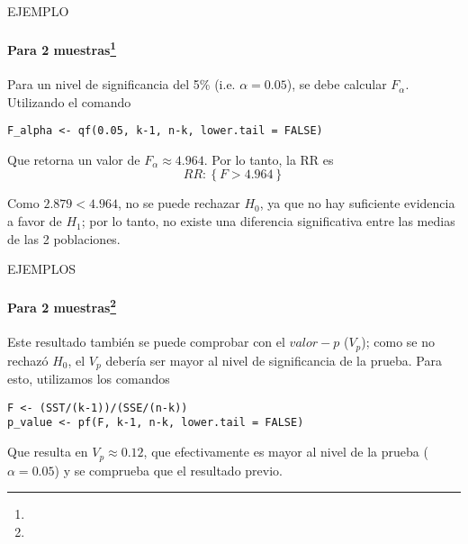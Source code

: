 \begin{frame}{EJEMPLO}
\framesubtitle{Para 2 muestras\footnote{}}
    Para un nivel de significancia del 5\% (i.e. $\alpha=0.05$), se debe calcular $F_\alpha$. Utilizando el comando
    
    \begin{center}
    \texttt{F\_alpha <- qf(0.05, k-1, n-k, lower.tail = FALSE)}
    \end{center}
    
    Que retorna un valor de $F_\alpha\approx4.964$. Por lo tanto, la RR es
    \begin{equation*}
        RR:\left\{F>4.964\right\}
    \end{equation*}
    
    Como $2.879<4.964$, no se puede rechazar $H_0$, ya que no hay suficiente evidencia a favor de $H_1$; por lo tanto, no existe una diferencia significativa entre las medias de las 2 poblaciones.
\end{frame}

\begin{frame}{EJEMPLOS}
    \framesubtitle{Para 2 muestras\footnote{}}
    Este resultado también se puede comprobar con el $valor-p$ ($V_p$); como se no rechazó $H_0$, el $V_p$ debería ser mayor al nivel de significancia de la prueba. Para esto, utilizamos los comandos
    
    \begin{center}
        \texttt{F <- (SST/(k-1))/(SSE/(n-k))\\
        p\_value <- pf(F, k-1, n-k, lower.tail = FALSE)}
    \end{center}
    
    Que resulta en $V_p\approx0.12$, que efectivamente es mayor al nivel de la prueba ($\alpha=0.05$) y se comprueba que el resultado previo.
\end{frame}
